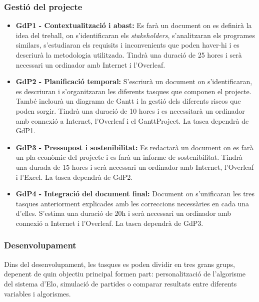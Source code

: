 \documentclass[a4paper]{article}
\begin{document}
\subsubsection{Gestió del projecte}
\begin{itemize}
    \item \textbf{GdP1 - Contextualització i abast:} Es farà un document on es definirà la idea del treball, on s'identificaran els \textit{stakeholders}, s'analitzaran els programes similars, s'estudiaran els requisits i inconvenients que poden haver-hi i es descriurà la metodologia utilitzada. Tindrà una duració de 25 hores i serà necessari un ordinador amb Internet i l'Overleaf.
    \item \textbf{GdP2 - Planificació temporal:} S'escriurà un document on s'identificaran, es descriuran i s'organitzaran les diferents tasques que componen el projecte. També inclourà un diagrama de Gantt i la gestió dels diferents riscos que poden sorgir. Tindrà una duració de 10 hores i es necessitarà un ordinador amb connexió a Internet, l'Overleaf i el GanttProject. La tasca dependrà de GdP1.
    \item \textbf{GdP3 - Pressupost i sostenibilitat:} Es redactarà un document on es farà un pla econòmic del projecte i es farà un informe de sostenibilitat. Tindrà una durada de 15 hores i serà necessari un ordinador amb Internet, l'Overleaf i l'Excel. La tasca dependrà de GdP2.
    \item \textbf{GdP4 - Integració del document final:} Document on s'unificaran les tres tasques anteriorment explicades amb les correccions necessàries en cada una d'elles. S'estima una duració de 20h i serà necessari un ordinador amb connexió a Internet i l'Overleaf. La tasca dependrà de GdP3.
\end{itemize}

\subsubsection{Desenvolupament}
Dins del desenvolupament, les tasques es poden dividir en tres grans grups, depenent de quin objectiu principal formen part: personalització de l’algorisme del sistema d’Elo, simulació de partides o comparar resultats entre diferents variables i algorismes.
\end{document}
